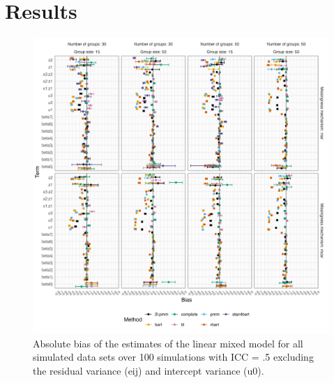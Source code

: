 \documentclass[10pt, a4paper, titlepage]{article}
\begin{document}
\section{Results}
\graphicspath{{./graphs/}}

\begin{figure}[H]
    \centering
    \label{fig:bias1}
    \includegraphics[width=1\textwidth]{bias1.png}
    \caption{Absolute bias of the estimates of the linear mixed model for all simulated data sets over 100 simulations with ICC = .5 excluding the residual variance (eij) and intercept variance (u0).}
\end{figure}
\end{document}
